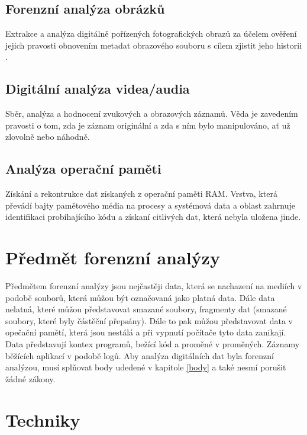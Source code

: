 \documentclass[thesis=B,czech]{FITthesis}[2012/06/26]
\begin{document}
\subsection{Forenzní analýza obrázků}
Extrakce a analýza digitálně pořízených fotografických obrazů za účelem ověření jejich pravosti obnovením metadat obrazového souboru s cílem zjistit jeho historii \cite{for_types}.

\subsection{Digitální analýza videa/audia}
Sběr, analýza a hodnocení zvukových a obrazových záznamů. Věda je zavedením pravosti o tom, zda je záznam originální a zda s ním bylo manipulováno, ať už zlovolně nebo náhodně.

\subsection{Analýza operační paměti}
Získání a rekontrukce dat získaných z operační paměti RAM. Vrstva, která převádí bajty pamětového média na procesy a systémová data a oblast zahrnuje identifikaci probíhajícího kódu a získaní citlivých dat, která nebyla uložena jinde\cite{carrier2003defining}. 




\section{Předmět forenzní analýzy}

Předmětem forenzní analýzy jsou nejčastěji data, která se nachazení na mediích v podobě souborů, která můžou být označovaná jako platná data. Dále data nelatná, které můžou představovat smazané soubory, fragmenty dat (smazané soubory, které byly částěční přepsány). Dále to pak můžou představovat data v opečační pamětí, která jsou nestálá a při vypnutí počítače tyto data zanikají. Data představují kontex programů, bežící kód a proměné v proměných. Záznamy běžících aplikací v podobě logů. 
Aby analýza digitálních dat byla forenzní analýzou, musí splňovat body udedené v kapitole \ref{body} a také nesmí porušit  žádné zákony.



\section{Techniky}
\end{document}
